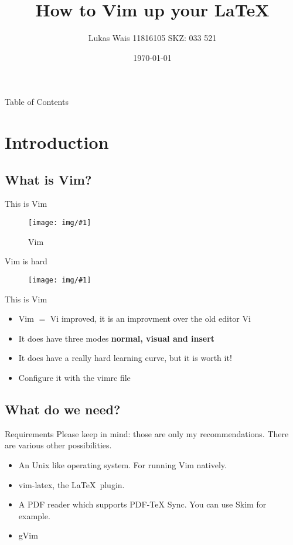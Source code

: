 \documentclass[aspectratio=169]{beamer}
\title{How to Vim up your \LaTeX}
\author{Lukas Wais 11816105 SKZ: 033 521}
\institute{Wissenschaftliches Schreiben und Layouten anhand von \LaTeX2}
\date{\today}
\newenvironment{MyPicture}[4]{
  \begin{figure}[h!]
    \centering
    \texttt{[image: img/\#1]}
    \caption{#2}
    \label{fig:#3}
  }
{\end{figure}}
\begin{document}
\frame{\titlepage}
\begin{frame}[allowframebreaks]{Table of Contents}
  \tableofcontents
\end{frame}
\section{Introduction}
\subsection{What is Vim?}
\begin{frame}{This is Vim}
  \begin{MyPicture}{vim}{Vim}{Vim}{width=0.4\textwidth}
  \end{MyPicture}
\end{frame}
\begin{frame}{Vim is hard}
  \begin{MyPicture}{meme}{}{meme}{width=0.4\textwidth}
  \end{MyPicture}
\end{frame}
\begin{frame}{This is Vim}
  \begin{itemize}
    \item Vim $=$ Vi improved, it is an improvment over the old editor Vi
    \item It does have three modes \textbf{normal, visual and insert}
    \item It does have a really hard learning curve, but it is worth it!
    \item Configure it with the vimrc file
  \end{itemize}
\end{frame}
\subsection{What do we need?}
\begin{frame}{Requirements}
  Please keep in mind: those are only my recommendations. There are various other possibilities.
  \begin{itemize}
    \item An Unix like operating system. For running Vim natively.
    \item vim-latex, the \LaTeX~plugin.
    \item A PDF reader which supports PDF-TeX Sync. You can use Skim for example.
    \item gVim
  \end{itemize}
\end{frame}
\end{document}
